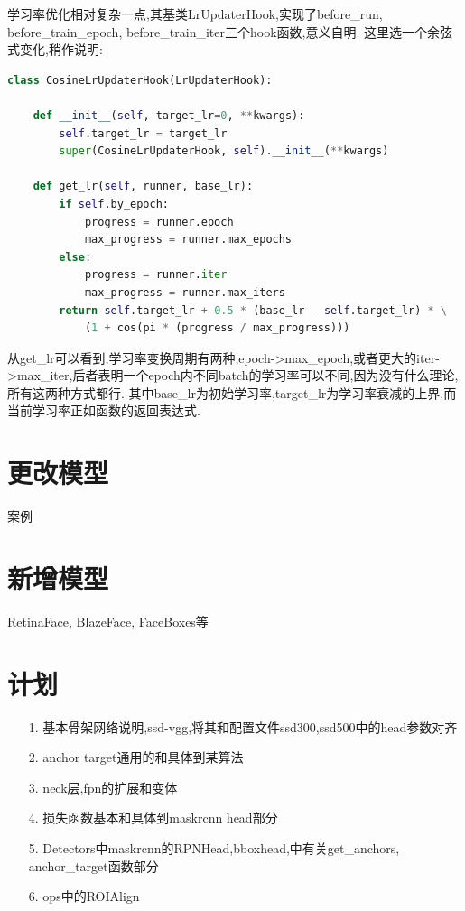 \documentclass[UTF8]{ctexart}
\begin{document}
学习率优化相对复杂一点,其基类LrUpdaterHook,实现了before\_run, before\_train\_epoch, before\_train\_iter三个hook函数,意义自明.
这里选一个余弦式变化,稍作说明:

\lstset{style=mystyle}
\begin{lstlisting}[language=Python]
class CosineLrUpdaterHook(LrUpdaterHook):

    def __init__(self, target_lr=0, **kwargs):
        self.target_lr = target_lr
        super(CosineLrUpdaterHook, self).__init__(**kwargs)

    def get_lr(self, runner, base_lr):
        if self.by_epoch:
            progress = runner.epoch
            max_progress = runner.max_epochs
        else:
            progress = runner.iter
            max_progress = runner.max_iters
        return self.target_lr + 0.5 * (base_lr - self.target_lr) * \
			(1 + cos(pi * (progress / max_progress)))
\end{lstlisting}
从get\_lr可以看到,学习率变换周期有两种,epoch->max\_epoch,或者更大的iter->max\_iter,后者表明一个epoch内不同batch的学习率可以不同,因为没有什么理论,所有这两种方式都行.
其中base\_lr为初始学习率,target\_lr为学习率衰减的上界,而当前学习率正如函数的返回表达式.

\section{更改模型}
案例
\section{新增模型}
RetinaFace, BlazeFace, FaceBoxes等

\section{计划}
\begin{itemize}
	\item[1.] 基本骨架网络说明,ssd-vgg,将其和配置文件ssd300,ssd500中的head参数对齐
	\item[2.] anchor target通用的和具体到某算法
	\item [3.] neck层,fpn的扩展和变体
	\item [4.] 损失函数基本和具体到maskrcnn head部分
	\item [5.] Detectors中maskrcnn的RPNHead,bboxhead,中有关get\_anchors, anchor\_target函数部分
	\item [6.] ops中的ROIAlign 
\end{itemize}
\end{document}
